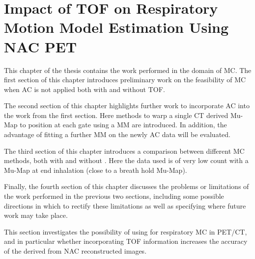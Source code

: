 \chapter{Impact of TOF on Respiratory Motion Model Estimation Using NAC PET} \label{sec:impact_of_tof_on_respiratory_motion_model_estimation_using_nac_pet}
    \newpage
    
        This chapter of the thesis contains the work performed in the domain of \gls{MC}. The first section of this chapter introduces preliminary work on the feasibility of \gls{MC} when \gls{AC} is not applied both with and without \gls{TOF}.
        
        The second section of this chapter highlights further work to incorporate \gls{AC} into the work from the first section. Here methods to warp a single \gls{CT} derived \gls{Mu-Map} to position at each gate using a \gls{MM} are introduced. In addition, the advantage of fitting a further \gls{MM} on the newly \gls{AC} data will be evaluated.
        
        The third section of this chapter introduces a comparison between different \gls{MC} methods, both with and without . Here the data used is of very low count with a \gls{Mu-Map} at end inhalation (close to a breath hold \gls{Mu-Map}).
        
        Finally, the fourth section of this chapter discusses the problems or limitations of the work performed in the previous two sections, including some possible directions in which to rectify these limitations as well as specifying where future work may take place.
    
    
        This section investigates the possibility of using  for respiratory \gls{MC} in \gls{PET}/\gls{CT}, and in particular whether incorporating \gls{TOF} information increases the accuracy of the  derived from \gls{NAC} reconstructed images.
        
